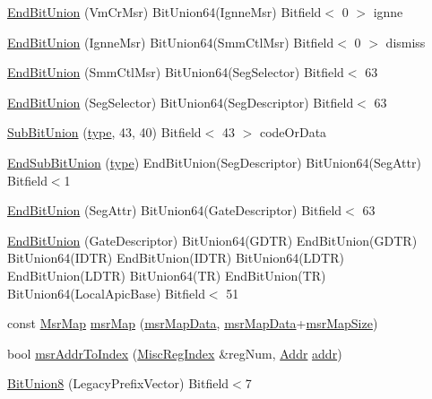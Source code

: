 \begin{DoxyCompactItemize}
\item 
\hyperlink{namespaceX86ISA_a945ea244714dcda0e95132651a6b6a2b}{EndBitUnion} (VmCrMsr) BitUnion64(IgnneMsr) Bitfield$<$ 0 $>$ ignne
\item 
\hyperlink{namespaceX86ISA_a05c2d5933fc3e914d510e22f350a1299}{EndBitUnion} (IgnneMsr) BitUnion64(SmmCtlMsr) Bitfield$<$ 0 $>$ dismiss
\item 
\hyperlink{namespaceX86ISA_a0e146559f65e9c20474dc622495ce138}{EndBitUnion} (SmmCtlMsr) BitUnion64(SegSelector) Bitfield$<$ 63
\item 
\hyperlink{namespaceX86ISA_a557b027e8beb1e3ff0df9a1e6d7bdbc3}{EndBitUnion} (SegSelector) BitUnion64(SegDescriptor) Bitfield$<$ 63
\item 
\hyperlink{namespaceX86ISA_a6eaf5d1fcd0ae9c78d54d6ecdf97b4b5}{SubBitUnion} (\hyperlink{namespaceX86ISA_ad805db903f6899f960fd9a982272096a}{type}, 43, 40) Bitfield$<$ 43 $>$ codeOrData
\item 
\hyperlink{namespaceX86ISA_a976b8cb8bfaed626dd601febbf0c6fe8}{EndSubBitUnion} (\hyperlink{namespaceX86ISA_ad805db903f6899f960fd9a982272096a}{type}) EndBitUnion(SegDescriptor) BitUnion64(SegAttr) Bitfield$<$1
\item 
\hyperlink{namespaceX86ISA_a0c774257513afdcf9b7a3da6b27b4dfd}{EndBitUnion} (SegAttr) BitUnion64(GateDescriptor) Bitfield$<$ 63
\item 
\hyperlink{namespaceX86ISA_aab653d3e00074b5297080e982bfbdbde}{EndBitUnion} (GateDescriptor) BitUnion64(GDTR) EndBitUnion(GDTR) BitUnion64(IDTR) EndBitUnion(IDTR) BitUnion64(LDTR) EndBitUnion(LDTR) BitUnion64(TR) EndBitUnion(TR) BitUnion64(LocalApicBase) Bitfield$<$ 51
\item 
const \hyperlink{namespaceX86ISA_afe7406830ac3c2d1d425e6b2f8985b0e}{MsrMap} \hyperlink{namespaceX86ISA_ad9614112983ab7c76827d78c01261157}{msrMap} (\hyperlink{namespaceX86ISA_a40c8f3c4b56cb7d97cb030da5c0307d9}{msrMapData}, \hyperlink{namespaceX86ISA_a40c8f3c4b56cb7d97cb030da5c0307d9}{msrMapData}+\hyperlink{namespaceX86ISA_adbf76fcc2f77bd504c0081638819d429}{msrMapSize})
\item 
bool \hyperlink{namespaceX86ISA_a700421607b87243921222a0b4183eef3}{msrAddrToIndex} (\hyperlink{namespaceX86ISA_a1e522017e015d4c7efd6b2360143aa67}{MiscRegIndex} \&regNum, \hyperlink{base_2types_8hh_af1bb03d6a4ee096394a6749f0a169232}{Addr} \hyperlink{namespaceX86ISA_ab705917f60c5566f9ce56a93f798b2e2}{addr})
\item 
\hyperlink{namespaceX86ISA_ad30679aa4800b378176d7d464eb5df97}{BitUnion8} (LegacyPrefixVector) Bitfield$<$7

\end{DoxyCompactItemize}

